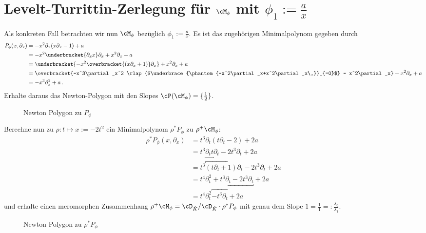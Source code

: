 \section{Levelt-Turrittin-Zerlegung für $\cM_{\phi}$ mit
  $\phi_1:=\frac{a}{x}$}
\begin{comment}
rechtfertigen, das mehr gerechnet wird, als nötig
\end{comment}
Als konkreten Fall betrachten wir nun $\cM_{\phi}$ bezüglich
$\phi_1:=\frac{a}{x}$. 
Es ist das zugehörigen Minimalpolynom gegeben durch
\begin{align*}
P_{\phi}(x,\partial_x) &=-x^2\partial_x (x\partial_x-1)+a
\\&=-x^2\underbracket{\partial_xx}\partial_x+x^2\partial_x+a
\\&=\underbracket{-x^2\overbracket{(x\partial_x+1)}\partial_x} + x^2\partial_x
  + a
\\&=\overbracket{-x^3\partial_x^2
  \rlap{$\underbrace{\phantom{-x^2\partial_x+x^2\partial_x\,}}_{=0}$}
  - x^2\partial_x}+x^2\partial_x+a
\\&=-x^3\partial_x^2+a \,.
\end{align*}
Erhalte daraus das Newton-Polygon mit den Slopes
$\cP(\cM_{\phi})=\{\frac{1}{2}\}$.
\begin{figure}[H] %
\begin{center}
\end{center}
\caption{Newton Polygon zu $P_{\phi}$}
\end{figure}
Berechne nun zu $\rho:t\mapsto x:=-2t^2$ ein Minimalpolynom $\rho^*P_{\phi}$
zu $\rho^+\cM_{\phi}$:
\begin{align*}
\rho^*P_{\phi}(x,\partial_x)
  &=t^{3}\partial_t(t\partial_t-2)+2a\\
  &=t^{3}\underbracket{\partial_tt}\partial_t-2t^{3}\partial_t+2a\\
  &=t^{3}\overbracket{(t\partial_t+1)}\partial_t-2t^{3}\partial_t+2a\\
  &=t^{4}\partial_t^2+\underbracket{t^{3}\partial_t-2t^{3}\partial_t}+2a\\
  &=t^{4}\partial_t^2\overbracket{-t^{3}\partial_t}+2a
\end{align*}
und erhalte einen meromorphen Zusammenhang $\rho^+\cM_{\phi}=\cD_{\hat
K}/\cD_{\hat K}\cdot\rho^*P_{\phi}$ mit genau dem Slope
$1=\frac{1}{1}=:\frac{\lambda_0}{\lambda_1}$.
\begin{figure}[H]
\begin{center}
\end{center}
\caption{Newton Polygon zu $\rho^*P_{\phi}$}
\end{figure}

